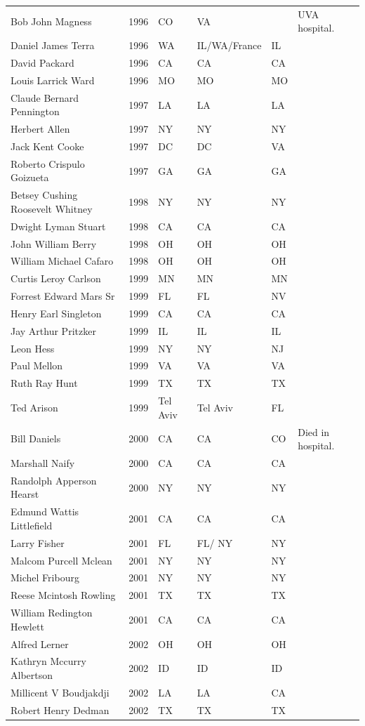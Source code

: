\documentclass[12pt]{article}
\begin{document}
{\begin{longtable}{l l l l l l}
		Bob John Magness&1996&CO&VA&&UVA hospital.\\
		Daniel James Terra&1996&WA&IL/WA/France&IL&\\
		David Packard&1996&CA&CA&CA&\\
		Louis Larrick Ward&1996&MO&MO&MO&\\
		Claude Bernard Pennington&1997&LA&LA&LA&\\
		Herbert Allen&1997&NY&NY&NY&\\
		Jack Kent Cooke&1997&DC&DC&VA&\\
		Roberto Crispulo Goizueta&1997&GA&GA&GA&\\
		Betsey Cushing Roosevelt Whitney&1998&NY&NY &NY&\\
		Dwight Lyman Stuart&1998&CA&CA&CA&\\
		John William Berry&1998&OH&OH&OH&\\
		William Michael Cafaro&1998&OH&OH&OH&\\
		Curtis Leroy Carlson&1999&MN&MN&MN&\\
		Forrest Edward Mars Sr&1999&FL&FL&NV&\\
		Henry Earl Singleton&1999&CA&CA&CA&\\
		Jay Arthur Pritzker&1999&IL&IL&IL&\\
		Leon Hess&1999&NY&NY&NJ&\\
		Paul Mellon&1999&VA&VA&VA&\\
		Ruth Ray Hunt&1999&TX&TX&TX&\\
		Ted Arison&1999&Tel Aviv&Tel Aviv&FL&\\
		Bill Daniels&2000&CA&CA&CO&Died in hospital.\\
		Marshall Naify&2000&CA&CA&CA&\\
		Randolph Apperson Hearst&2000&NY&NY&NY&\\
		Edmund Wattis Littlefield&2001&CA&CA&CA&\\
		Larry Fisher&2001&FL&FL/ NY&NY&\\
		Malcom Purcell Mclean&2001&NY&NY&NY&\\
		Michel Fribourg&2001&NY&NY&NY&\\
		Reese Mcintosh Rowling&2001&TX&TX&TX&\\
		William Redington Hewlett&2001&CA&CA&CA&\\
		Alfred Lerner&2002&OH&OH&OH&\\
		Kathryn Mccurry Albertson&2002&ID&ID&ID&\\
		Millicent V Boudjakdji&2002&LA&LA&CA&\\
		Robert Henry Dedman&2002&TX&TX&TX&\\

\end{longtable}}
\end{document}
